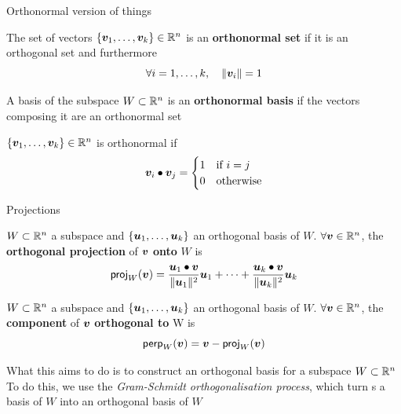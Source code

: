 \documentclass[aspectratio=169]{beamer}\usepackage[]{graphicx}\usepackage[]{xcolor}
\begin{document}
\begin{frame}{Orthonormal version of things}
\begin{definition}
The set of vectors $\{\bm{v}_1,\ldots,\bm{v}_k\}\in\mathbb{R}^n$ is an \textbf{orthonormal set} if it is an orthogonal set and furthermore
\[
\forall i=1,\ldots,k,\quad \|\bm{v}_i\|=1
\]
\end{definition}
\begin{definition}
A basis of the subspace $W\subset\mathbb{R}^n$ is an \textbf{orthonormal basis} if the vectors composing it are an orthonormal set
\end{definition}
\vfill
$\{\bm{v}_1,\ldots,\bm{v}_k\}\in\mathbb{R}^n$ is orthonormal if
\[
\bm{v}_i\bullet\bm{v}_j =
\begin{cases}
1 &\textrm{if }i=j \\
0 &\textrm{otherwise}
\end{cases}
\]
\end{frame}


\begin{frame}{Projections}
	\begin{definition}
	$W\subset\mathbb{R}^n$ a subspace and $\{\bm{u}_1,\ldots,\bm{u}_k\}$ an orthogonal basis of $W$. $\forall\bm{v}\in\mathbb{R}^n$, the \textbf{orthogonal projection} of $\bm{v}$ \textbf{onto} $W$ is
	\[
	\mathsf{proj}_W(\bm{v}) =
	\frac{\bm{u}_1\bullet\bm{v}}{\|\bm{u}_1\|^2}\bm{u}_1
	+\cdots+
	\frac{\bm{u}_k\bullet\bm{v}}{\|\bm{u}_k\|^2}\bm{u}_k
	\]  
	\end{definition}
	\vfill
	\begin{definition}
	$W\subset\mathbb{R}^n$ a subspace and $\{\bm{u}_1,\ldots,\bm{u}_k\}$ an orthogonal basis of $W$. $\forall\bm{v}\in\mathbb{R}^n$, the \textbf{component} of  $\bm{v}$ \textbf{orthogonal to} W is
	\[
	\mathsf{perp}_W(\bm{v})=\bm{v}-\mathsf{proj}_W(\bm{v})
	\]
	\end{definition}	
	\end{frame}
	

	\begin{frame}
	What this aims to do is to construct an orthogonal basis for a subspace $W\subset\mathbb{R}^n$
	\vfill
	To do this, we use the \emph{Gram-Schmidt orthogonalisation process}, which turn s a basis of $W$ into an orthogonal basis of $W$
	\end{frame}
\end{document}
